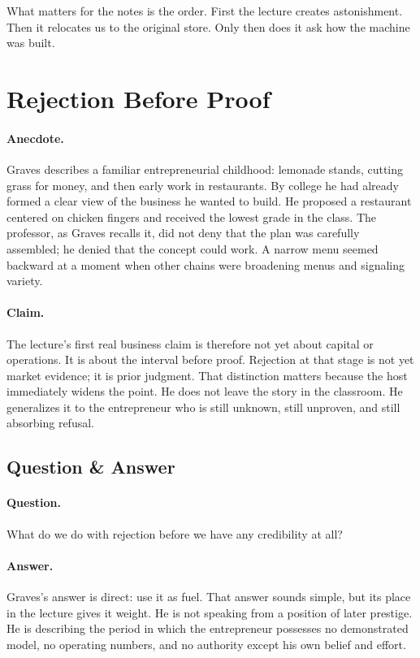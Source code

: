 What matters for the notes is the order. First the lecture creates astonishment. Then it relocates us to the original store. Only then does it ask how the machine was built.

\section{Rejection Before Proof}

\paragraph{Anecdote.}
Graves describes a familiar entrepreneurial childhood: lemonade stands, cutting grass for money, and then early work in restaurants. By college he had already formed a clear view of the business he wanted to build. He proposed a restaurant centered on chicken fingers and received the lowest grade in the class. The professor, as Graves recalls it, did not deny that the plan was carefully assembled; he denied that the concept could work. A narrow menu seemed backward at a moment when other chains were broadening menus and signaling variety.

\paragraph{Claim.}
The lecture's first real business claim is therefore not yet about capital or operations. It is about the interval before proof. Rejection at that stage is not yet market evidence; it is prior judgment. That distinction matters because the host immediately widens the point. He does not leave the story in the classroom. He generalizes it to the entrepreneur who is still unknown, still unproven, and still absorbing refusal.

\subsection{Question \& Answer}

\paragraph{Question.}
What do we do with rejection before we have any credibility at all?

\paragraph{Answer.}
Graves's answer is direct: use it as fuel. That answer sounds simple, but its place in the lecture gives it weight. He is not speaking from a position of later prestige. He is describing the period in which the entrepreneur possesses no demonstrated model, no operating numbers, and no authority except his own belief and effort.

